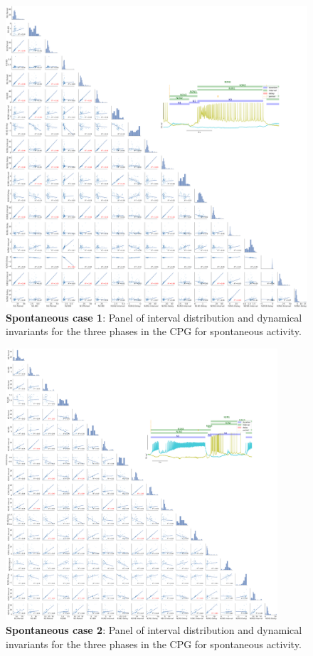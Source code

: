 \begin{figure}[htbp]
	\centering
	\includegraphics[width=\textwidth]{./img/invariants/data/SUSSEX/prep2/images/3phases/panel_with_pairplot.png}
	\caption{\textbf{Spontaneous case 1}: Panel of interval distribution and dynamical invariants for the three phases in the CPG for spontaneous activity.}
	\label{fig:prep2 invariants pairplot}
\end{figure}



\begin{figure}[htbp]
	\centering
	\includegraphics[width=0.9\textwidth]{./img/invariants/data/SUSSEX/prep3/images/3phases/panel_with_pairplot.png}
	\caption{\textbf{Spontaneous case 2}: Panel of interval distribution and dynamical invariants for the three phases in the CPG for spontaneous activity.}
	\label{fig:prep3 invariants pairplot}
\end{figure}


